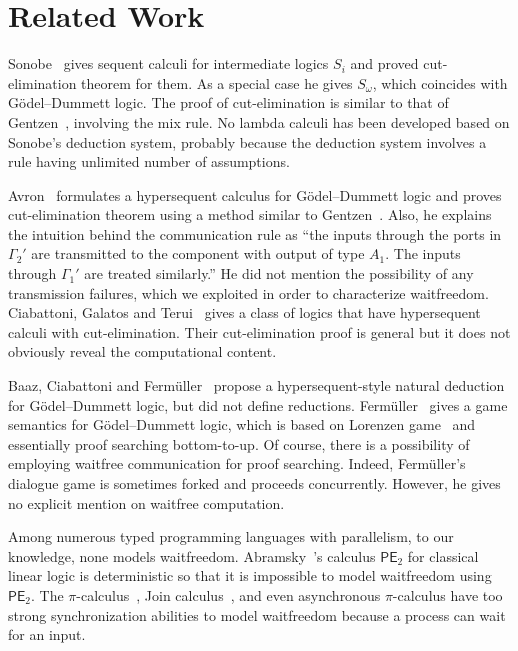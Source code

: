 \section{Related Work}
\label{related}

Sonobe~\cite{sonobe} gives sequent calculi for intermediate logics $S_i$
and proved cut-elimination theorem for them.  As a special case he gives
$S_\omega$, which coincides with G\"odel--Dummett logic.
The proof of cut-elimination is similar to that of
Gentzen~\cite{gentzen}, involving the mix rule.
No lambda calculi has been developed based on Sonobe's deduction system,
probably because the deduction system involves a rule having unlimited
number of assumptions.

Avron~\cite{avron91} formulates a
hypersequent calculus for G\"odel--Dummett logic and proves
cut-elimination theorem using a method
similar to Gentzen~\cite{gentzen}.
Also, he explains the intuition behind the communication rule as
``the inputs through the ports in $\Gamma_2'$ are transmitted to the
component with output of type $A_1.$  The inputs through $\Gamma_1'$ are
treated similarly.''  He did not mention the possibility of
any transmission failures, which we exploited
in order to characterize waitfreedom.
Ciabattoni, Galatos and Terui~\cite{alg} gives a class of logics
that have hypersequent calculi with cut-elimination.
Their cut-elimination proof is general but it does not
obviously reveal the computational content.

Baaz, Ciabattoni and Ferm\"uller~\cite{natural} propose a
hypersequent-style natural deduction for G\"odel--Dummett logic, but
did not define reductions.
Ferm\"uller~\cite{parallel} gives a game semantics for G\"odel--Dummett
logic, which is based on Lorenzen game~\cite{curryhoward} and essentially
proof searching bottom-to-up.
Of course, there is a possibility of employing waitfree communication
for proof searching. Indeed, Ferm\"uller's dialogue game is
sometimes forked and proceeds concurrently.
However, he gives no explicit mention on waitfree computation.

Among numerous typed programming languages with parallelism,
to our knowledge, none models waitfreedom.
Abramsky~\cite{abramsky1993computational}'s calculus $\mathsf{PE}_2$
for classical linear logic is
deterministic
\cite[Theorem~7.9]{abramsky1993computational} so that it is
impossible to model
waitfreedom using $\mathsf{PE}_2$.
The $\pi$-calculus~\cite{milner1999communicating},
Join calculus~\cite{join},
and even asynchronous
$\pi$-calculus \cite{hondatokoro}
have too strong synchronization abilities to model waitfreedom because
a process can wait for an input.

